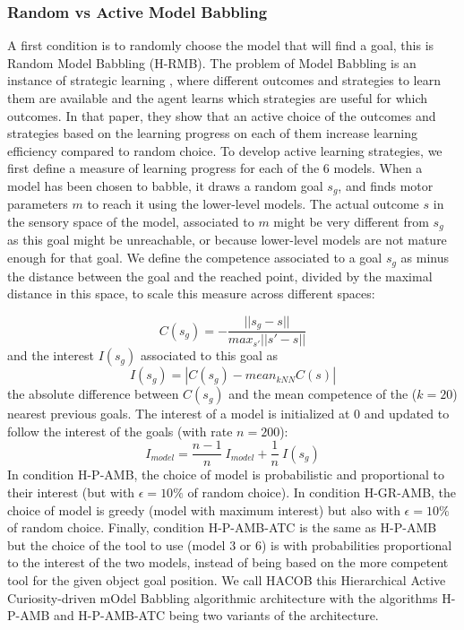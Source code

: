 \documentclass[10pt,letterpaper]{article}
\begin{document}
		
		\subsubsection{Random vs Active Model Babbling}
		
			A first condition is to randomly choose the model that will find a goal, this is Random Model Babbling (H-RMB).
			The problem of Model Babbling is an instance of strategic learning \cite{nguyen2012}, 
			where different outcomes and strategies to learn them are available and the agent learns which strategies are useful for which outcomes.
			In that paper, they show that an active choice of the outcomes and strategies based on the learning progress on each of them increase learning efficiency compared to random choice.
			To develop active learning strategies, we first define a measure of learning progress for each of the $6$ models.
			When a model has been chosen to babble, it draws a random goal $s_g$, and finds motor parameters $m$ to reach it using the lower-level models.
			The actual outcome $s$ in the sensory space of the model, associated to $m$ might be very different from $s_g$ as this goal might be unreachable, or because lower-level models are not mature enough for that goal.
			We define the competence associated to a goal $s_g$ as minus the distance between the goal and the reached point, divided by the maximal distance in this space, to scale this measure across different spaces:
			
			\begin{equation}
				C(s_g)=-\frac{||s_g-s||}{max_{s'}||s'-s||}
			\end{equation}
			 and the interest $I(s_g)$ associated to this goal as 
			\begin{equation}
				I(s_g) = |C(s_g) - mean_{kNN}C(s)|
			\end{equation}
			the absolute difference between $C(s_g)$ and the mean competence of the ($k=20$) nearest previous goals.
			The interest of a model is initialized at $0$ and updated to follow the interest of the goals (with rate $n=200$):
			\begin{equation}
				I_{model}=\frac{n-1}{n}~I_{model} + \frac{1}{n}~I(s_g)
			\end{equation}
			In condition H-P-AMB, the choice of model is probabilistic and proportional to their interest (but with $\epsilon=10\%$ of random choice). 
			In condition H-GR-AMB, the choice of model is greedy (model with maximum interest) but also with $\epsilon=10\%$ of random choice.
			Finally, condition H-P-AMB-ATC is the same as H-P-AMB but the choice of the tool to use (model $3$ or $6$) is with probabilities proportional to the interest of the two models, 
			instead of being based on the more competent tool for the given object goal position.
			We call HACOB this Hierarchical Active Curiosity-driven mOdel Babbling algorithmic architecture with the algorithms H-P-AMB and H-P-AMB-ATC being two variants of the architecture.
\end{document}
